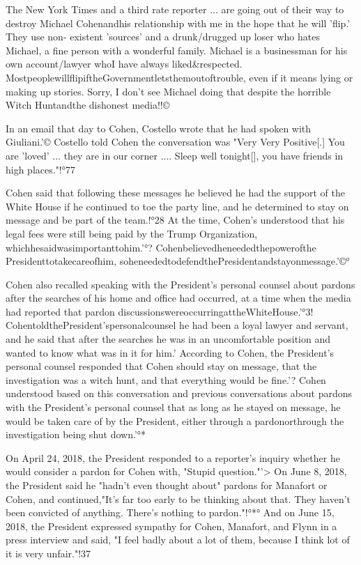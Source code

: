 The New York Times and a third rate reporter ... are going out of their way to destroy Michael Cohenandhis relationship with me in the hope that he will 'flip.'
They use non- existent 'sources' and a drunk/drugged up loser who hates Michael, a fine person with a wonderful family.
Michael is a businessman for his own account/lawyer whoI have always liked\&respected.
MostpeoplewillflipiftheGovernmentletsthemoutoftrouble, even if it means lying or making up stories.
Sorry, I don't see Michael doing that despite the horrible Witch Huntandthe dishonest media!!©%

In an email that day to Cohen, Costello wrote that he had spoken with Giuliani.'© Costello told Cohen the conversation was "Very Very Positive[.] You are 'loved' ... they are in our corner .... Sleep well tonight[], you have friends in high places."!°77

Cohen said that following these messages he believed he had the support of the White House if he continued to toe the party line, and he determined to stay on message and be part of the team.!°28
At the time, Cohen's understood that his legal fees were still being paid by the Trump Organization, whichhesaidwasimportanttohim.'°?
Cohenbelievedheneededthepowerofthe Presidenttotakecareofhim, soheneededtodefendthePresidentandstayonmessage.'©°

Cohen also recalled speaking with the President's personal counsel about pardons after the searches of his home and office had occurred, at a time when the media had reported that pardon discussionswereoccurringattheWhiteHouse.'°3!
CohentoldthePresident'spersonalcounsel he had been a loyal lawyer and servant, and he said that after the searches he was in an uncomfortable position and wanted to know what was in it for him.'%
According to Cohen, the President's personal counsel responded that Cohen should stay on message, that the investigation was a witch hunt, and that everything would be fine.'?
Cohen understood based on this conversation and previous conversations about pardons with the President's personal counsel that as long as he stayed on message, he would be taken care of by the President, either through a pardonorthrough the investigation being shut down.'°*

On April 24, 2018, the President responded to a reporter's inquiry whether he would consider a pardon for Cohen with, "Stupid question."'>
On June 8, 2018, the President said he "hadn't even thought about" pardons for Manafort or Cohen, and continued,"It's far too early to be thinking about that.
They haven't been convicted of anything.
There's nothing to pardon."!°*°
And on June 15, 2018, the President expressed sympathy for Cohen, Manafort, and Flynn in a press interview and said, "I feel badly about a lot of them, because I think lot of it is very unfair."!37

